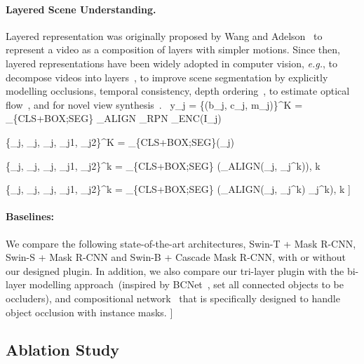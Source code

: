 \documentclass{bmvc2k}
\begin{document}
\paragraph{Layered Scene Understanding.}
Layered representation was originally proposed by Wang and Adelson~\cite{Wang94}
to represent a video as a composition of layers with simpler motions.
Since then, layered representations have been widely adopted in computer vision,
{\em e.g.}, to decompose videos into layers~\cite{brostow1999motion, Jojic01}, 
to improve scene segmentation by explicitly modelling occlusions, temporal consistency, depth ordering~\cite{winn2006layout, Kumar08,yang2010layered,yang2011layered},
to estimate optical flow~\cite{Sun12,Sun13,Wulff14,Wulff15}, and for novel view synthesis~\cite{zitnick2004high}. 
\
y_j = \{(b_j, c_j, m_j)\}^K = \Phi_{\{\textsc{CLS+BOX;SEG}\}} \circ \Phi_{\textsc{ALIGN}} \circ  \Phi_{\textsc{RPN}} \circ  \Phi_{\textsc{ENC}}(I_j)

    \{_j, _j, _j, _{j1}, _{j2}\}^K = \Phi_{\{\textsc{CLS+BOX;SEG}\}}(_j)

   \{_j, _j, _j, _{j1}, _{j2}\}^k = \Phi_{\{\textsc{CLS+BOX;SEG}\}} (\Phi_{\textsc{ALIGN}}(_j, _j^k)), \hspace{3pt} \forall k \in [1,K]

   \{_j, _j, _j, _{j1}, _{j2}\}^k = \Phi_{\{\textsc{CLS+BOX;SEG}\}}  (\Phi_{\textsc{ALIGN}}(_j, _j^k) \otimes {}_j^k), \hspace{3pt} \forall k \in [1,K]
-0.8cm]

\paragraph{Baselines:} 
We compare the following state-of-the-art architectures,
 Swin-T + Mask R-CNN, Swin-S + Mask R-CNN and Swin-B + Cascade Mask R-CNN, with or without our designed plugin. 
In addition, we also compare our tri-layer plugin with the bi-layer modelling approach~(inspired by BCNet~\cite{ke2021bcnet}, set all connected objects to be occluders), and compositional network~\cite{yuan2021robust} that is specifically designed to handle object occlusion with instance masks. \-0.6cm]



\subsection{Ablation Study}
\label{sec:ablation_study}
\vspace{-0.1cm}
\end{document}

